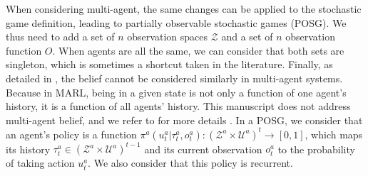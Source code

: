 When considering multi-agent, the same changes can be applied to the stochastic game definition, leading to partially observable stochastic games (POSG).
We thus need to add a set of $n$ observation spaces $\mathcal{Z}$ and a set of $n$ observation function $O$.
When agents are all the same, we can consider that both sets are singleton, which is sometimes a shortcut taken in the literature.
Finally, as detailed in \citep{DecPomdp}, the belief cannot be considered similarly in multi-agent systems.
Because in MARL, being in a given state is not only a function of one agent's history, it is a function of all agents' history.
This manuscript does not address multi-agent belief, and we refer to \citep{DecPomdp} for more details .
In a POSG, we consider that an agent's policy is a function $\pi^{a}(u_t^{a}|\tau_t^{a},o_t^{a}): (\mathcal{Z}^a \times \mathcal{U}^a)^t \rightarrow [0,1]$, which maps its history $\tau_t^{a} \in (\mathcal{Z}^a \times \mathcal{U}^a)^{t-1}$ and its current observation $o_t^{a}$ to the probability of taking action $u_t^{a}$.
We also consider that this policy is recurrent.


